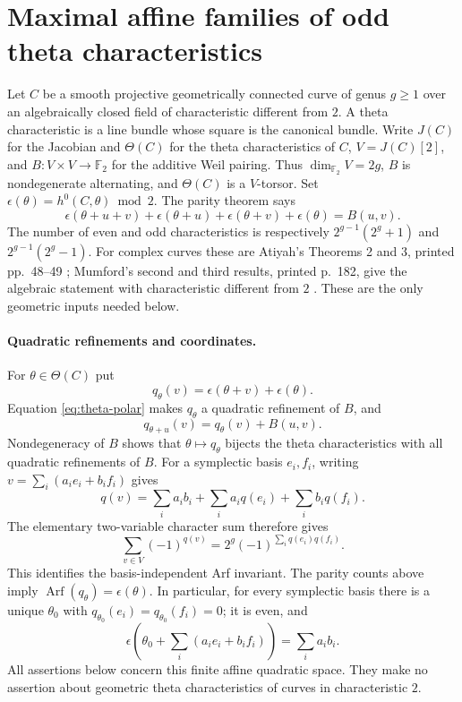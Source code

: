 \section{Maximal affine families of odd theta characteristics}
\label{sec:odd-theta-affine}

Let \(C\) be a smooth projective geometrically connected curve of genus
\(g\geq1\) over an algebraically closed field of characteristic different
from \(2\). A theta characteristic is a line bundle whose square is
the canonical bundle. Write \(J(C)\) for the Jacobian and
\(\Theta(C)\) for the theta characteristics of \(C\),
\(V=J(C)[2]\), and \(B:V\times V\to\mathbb F_2\) for the additive Weil
pairing. Thus \(\dim_{\mathbb F_2}V=2g\), \(B\) is nondegenerate
alternating, and \(\Theta(C)\) is a \(V\)-torsor. Set
\(\epsilon(\theta)=h^0(C,\theta)\bmod2\).
The parity theorem says
\begin{equation}
 \epsilon(\theta+u+v)+\epsilon(\theta+u)
 +\epsilon(\theta+v)+\epsilon(\theta)=B(u,v).
 \label{eq:theta-polar}
\end{equation}
The number of even and odd characteristics is respectively
\(2^{g-1}(2^g+1)\) and \(2^{g-1}(2^g-1)\).
For complex curves these are Atiyah's Theorems 2 and 3, printed
pp.~48--49 \citep{Atiyah1971Spin}; Mumford's second and third results,
printed p.~182, give the algebraic statement with characteristic
different from \(2\) \citep{Mumford1971Theta}. These are the only geometric
inputs needed below.

\paragraph{Quadratic refinements and coordinates.}
For \(\theta\in\Theta(C)\) put
\[
 q_\theta(v)=\epsilon(\theta+v)+\epsilon(\theta).
\]
Equation \eqref{eq:theta-polar} makes \(q_\theta\) a quadratic refinement
of \(B\), and
\begin{equation}
 q_{\theta+u}(v)=q_\theta(v)+B(u,v).
 \label{eq:theta-translation}
\end{equation}
Nondegeneracy of \(B\) shows that \(\theta\mapsto q_\theta\) bijects the
theta characteristics with all quadratic refinements of \(B\). For a
symplectic basis \(e_i,f_i\), writing \(v=\sum_i(a_ie_i+b_if_i)\) gives
\[
 q(v)=\sum_i a_ib_i+\sum_i a_iq(e_i)+\sum_i b_iq(f_i).
\]
The elementary two-variable character sum therefore gives
\begin{equation}
 \sum_{v\in V}(-1)^{q(v)}
   =2^g(-1)^{\sum_iq(e_i)q(f_i)}.
 \label{eq:theta-gauss}
\end{equation}
This identifies the basis-independent Arf invariant. The parity counts
above imply
\(\operatorname{Arf}(q_\theta)=\epsilon(\theta)\).
In particular, for every symplectic basis there is a unique
\(\theta_0\) with \(q_{\theta_0}(e_i)=q_{\theta_0}(f_i)=0\); it is even,
and
\begin{equation}
 \epsilon\!\left(\theta_0+\sum_i(a_ie_i+b_if_i)\right)=\sum_i a_ib_i.
 \label{eq:theta-hyperbolic-coordinates}
\end{equation}
All assertions below concern this finite affine quadratic space.
They make no assertion about geometric theta characteristics of curves
in characteristic \(2\).

